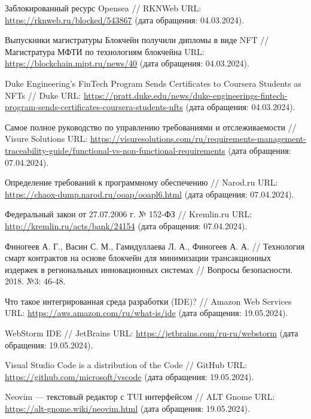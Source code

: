 \begin{thebibliography}{99\kern\bibindent}
	 Заблокированный ресурс Opensea // RKNWeb URL: \url{https://rknweb.ru/blocked/543867} (дата обращения: 04.03.2024).

	 Выпускники магистратуры Блокчейн получили дипломы в виде NFT // Магистратура МФТИ по технологиям блокчейна URL: \url{https://blockchain.mipt.ru/news/40} (дата обращения: 04.03.2024).

	 Duke Engineering’s FinTech Program Sends Certificates to Coursera Students as NFTs // Duke URL: \url{https://pratt.duke.edu/news/duke-engineerings-fintech-program-sends-certificates-coursera-students-nfts} (дата обращения: 04.03.2024).
		
	 Самое полное руководство по управлению требованиями и отслеживаемости // Visure Solutions URL: \url{https://visuresolutions.com/ru/requirements-management-traceability-guide/functional-vs-non-functional-requirements} (дата обращения: 07.04.2024).

	 Определение требований к программному обеспечению  // Narod.ru URL: \url{https://chaox-dump.narod.ru/ooap/ooapl6.html} (дата обращения: 07.04.2024).

	 Федеральный закон от 27.07.2006 г. № 152-ФЗ // Kremlin.ru URL: \url{http://kremlin.ru/acts/bank/24154} (дата обращения: 07.04.2024).
	
	 Финогеев А. Г., Васин С. М., Гамидуллаева Л. А., Финогеев А. А. // Технология смарт контрактов на основе блокчейн для минимизации трансакционных издержек в региональных инновационных системах // Вопросы безопасности. 2018. №3: 46-48. %
	
	 Что такое интегрированная среда разработки (IDE)? // Amazon Web Services URL: \url{https://aws.amazon.com/ru/what-is/ide} (дата обращения: 19.05.2024).

	 WebStorm IDE // JetBrains URL: \url{https://jetbrains.com/ru-ru/webstorm} (дата обращения: 19.05.2024).

	 Visual Studio Code is a distribution of the Code // GitHub URL: \url{https://github.com/microsoft/vscode} (дата обращения: 19.05.2024).

	 Neovim — текстовый редактор с TUI интерфейсом // ALT Gnome URL: \url{https://alt-gnome.wiki/neovim.html} (дата обращения: 19.05.2024).


\end{thebibliography}
